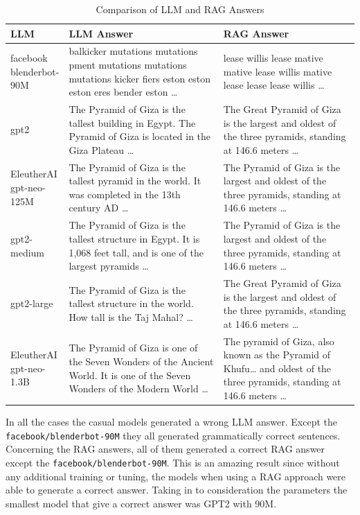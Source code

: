 \documentclass{wseas}
\begin{document}

\begin{table}[htbp]
\centering
\begin{tabular}{|p{0.10\linewidth}|p{0.48\linewidth}|p{0.42\linewidth}|}
\hline
\textbf{LLM} & \textbf{LLM Answer} & \textbf{RAG Answer} \\ \hline
facebook blenderbot-90M & balkicker mutations mutations pment mutations mutations mutations kicker fiers eston eston eston eres bender eston \ldots{} & lease willis lease mative mative lease willis mative lease lease lease willis \ldots{} \\ \hline
gpt2 & The Pyramid of Giza is the tallest building in Egypt. The Pyramid of Giza is located in the Giza Plateau \ldots{} & The Great Pyramid of Giza is the largest and oldest of the three pyramids, standing at 146.6 meters \ldots{} \\ \hline
EleutherAI gpt-neo-125M & The Pyramid of Giza is the tallest pyramid in the world. It was completed in the 13th century AD \ldots{} & The Pyramid of Giza is the largest and oldest of the three pyramids, standing at 146.6 meters \ldots{} \\ \hline
gpt2-medium & The Pyramid of Giza is the tallest structure in Egypt. It is 1,068 feet tall, and is one of the largest pyramids \ldots{} & The Pyramid of Giza is the largest and oldest of the three pyramids, standing at 146.6 meters \ldots{} \\ \hline
gpt2-large & The Pyramid of Giza is the tallest structure in the world. How tall is the Taj Mahal? \ldots{} & The Great Pyramid of Giza is the largest and oldest of the three pyramids, standing at 146.6 meters \ldots{} \\ \hline
EleutherAI gpt-neo-1.3B & The Pyramid of Giza is one of the Seven Wonders of the Ancient World. It is one of the Seven Wonders of the Modern World \ldots{} & The pyramid of Giza, also known as the Pyramid of Khufu\ldots{} and oldest of the three pyramids, standing at 146.6 meters \ldots{} \\ \hline
\end{tabular}
\caption{Comparison of LLM and RAG Answers}
\end{table}

In all the cases the casual models generated a wrong LLM answer. Except
the \texttt{facebook/blenderbot-90M} they all generated grammatically
correct sentences. Concerning the RAG answers, all of them generated a
correct RAG answer except the \texttt{facebook/blenderbot-90M}. This is
an amazing result since without any additional training or tuning, the
models when using a RAG approach were able to generate a correct answer.
Taking in to consideration the parameters the smallest model that give a
correct answer was GPT2 with 90M.
\end{document}
